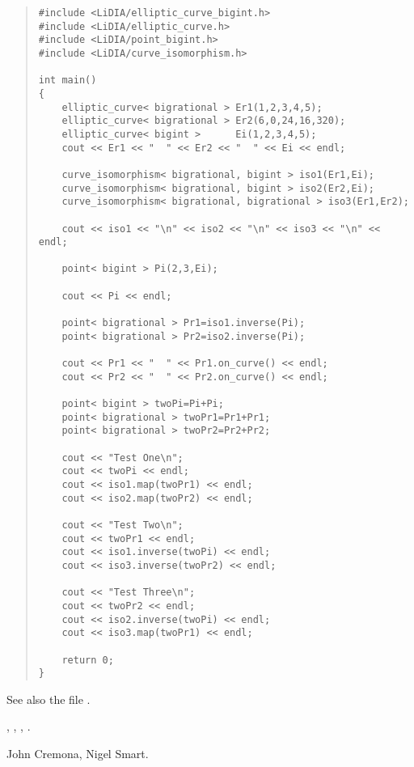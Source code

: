\begin{quote}
\begin{verbatim}
#include <LiDIA/elliptic_curve_bigint.h>
#include <LiDIA/elliptic_curve.h>
#include <LiDIA/point_bigint.h>
#include <LiDIA/curve_isomorphism.h>

int main()
{
    elliptic_curve< bigrational > Er1(1,2,3,4,5);
    elliptic_curve< bigrational > Er2(6,0,24,16,320);
    elliptic_curve< bigint >      Ei(1,2,3,4,5);
    cout << Er1 << "  " << Er2 << "  " << Ei << endl;

    curve_isomorphism< bigrational, bigint > iso1(Er1,Ei);
    curve_isomorphism< bigrational, bigint > iso2(Er2,Ei);
    curve_isomorphism< bigrational, bigrational > iso3(Er1,Er2);

    cout << iso1 << "\n" << iso2 << "\n" << iso3 << "\n" << endl;

    point< bigint > Pi(2,3,Ei);

    cout << Pi << endl;

    point< bigrational > Pr1=iso1.inverse(Pi);
    point< bigrational > Pr2=iso2.inverse(Pi);

    cout << Pr1 << "  " << Pr1.on_curve() << endl;
    cout << Pr2 << "  " << Pr2.on_curve() << endl;

    point< bigint > twoPi=Pi+Pi;
    point< bigrational > twoPr1=Pr1+Pr1;
    point< bigrational > twoPr2=Pr2+Pr2;

    cout << "Test One\n";
    cout << twoPi << endl;
    cout << iso1.map(twoPr1) << endl;
    cout << iso2.map(twoPr2) << endl;

    cout << "Test Two\n";
    cout << twoPr1 << endl;
    cout << iso1.inverse(twoPi) << endl;
    cout << iso3.inverse(twoPr2) << endl;

    cout << "Test Three\n";
    cout << twoPr2 << endl;
    cout << iso2.inverse(twoPi) << endl;
    cout << iso3.map(twoPr1) << endl;

    return 0;
}
\end{verbatim}
\end{quote}

See also the file
.



\SEEALSO

,
,
,
.



\AUTHOR

John Cremona, Nigel Smart.

